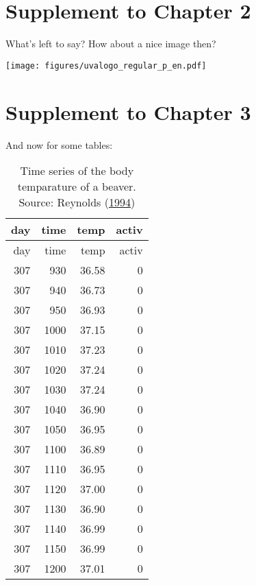 \documentclass[12pt,english,a4paper,oneside,]{book} %
\theoremstyle{definition}
\theoremstyle{definition}
\theoremstyle{definition}
\theoremstyle{remark}
\begin{document}
\hypertarget{appendix-appendix}{%
\appendix}


\hypertarget{supplement-to-chapter-2}{%
\chapter{Supplement to Chapter 2}\label{supplement-to-chapter-2}}

What's left to say? How about a nice image then?

\texttt{[image: figures/uvalogo\_regular\_p\_en.pdf]}

\hypertarget{supplement-to-chapter-3}{%
\chapter{Supplement to Chapter 3}\label{supplement-to-chapter-3}}

And now for some tables:

\begin{longtable}[]{@{}rrrr@{}}
\caption{\label{tab:beaver-2} Time series of the body temparature of a beaver. Source: Reynolds (\protect\hyperlink{ref-Reynolds1994}{1994})}\tabularnewline
\toprule
day & time & temp & activ\tabularnewline
\midrule
\endfirsthead
\toprule
day & time & temp & activ\tabularnewline
\midrule
\endhead
307 & 930 & 36.58 & 0\tabularnewline
307 & 940 & 36.73 & 0\tabularnewline
307 & 950 & 36.93 & 0\tabularnewline
307 & 1000 & 37.15 & 0\tabularnewline
307 & 1010 & 37.23 & 0\tabularnewline
307 & 1020 & 37.24 & 0\tabularnewline
307 & 1030 & 37.24 & 0\tabularnewline
307 & 1040 & 36.90 & 0\tabularnewline
307 & 1050 & 36.95 & 0\tabularnewline
307 & 1100 & 36.89 & 0\tabularnewline
307 & 1110 & 36.95 & 0\tabularnewline
307 & 1120 & 37.00 & 0\tabularnewline
307 & 1130 & 36.90 & 0\tabularnewline
307 & 1140 & 36.99 & 0\tabularnewline
307 & 1150 & 36.99 & 0\tabularnewline
307 & 1200 & 37.01 & 0\tabularnewline
\bottomrule
\end{longtable}
\end{document}
